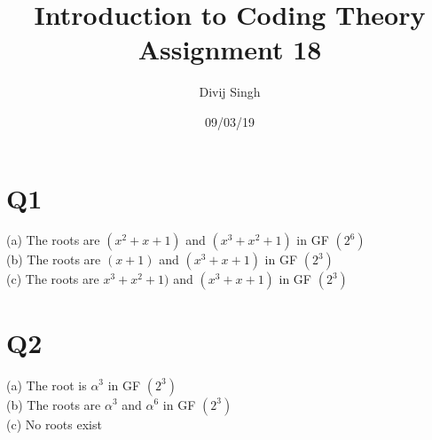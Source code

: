 \documentclass{article}
\title{Introduction to Coding Theory Assignment 18}
\author{Divij Singh}
\date{09/03/19}
\begin{document}
	\maketitle
	
	\section{Q1}
(a) The roots are $(x^2 + x + 1)$ and $(x^3 + x^2 + 1)$ in GF $(2^6)$\\
(b) The roots are $(x+1)$ and $(x^3 + x + 1)$ in GF $(2^3)$\\
(c) The roots are $x^3 + x^2 + 1)$ and $(x^3 + x + 1)$ in GF $(2^3)$

\section{Q2}
(a) The root is $\alpha^3$ in GF $(2^3)$\\
(b) The roots are $\alpha^3$ and $\alpha^6$ in GF $(2^3)$\\
(c) No roots exist
\end{document}
